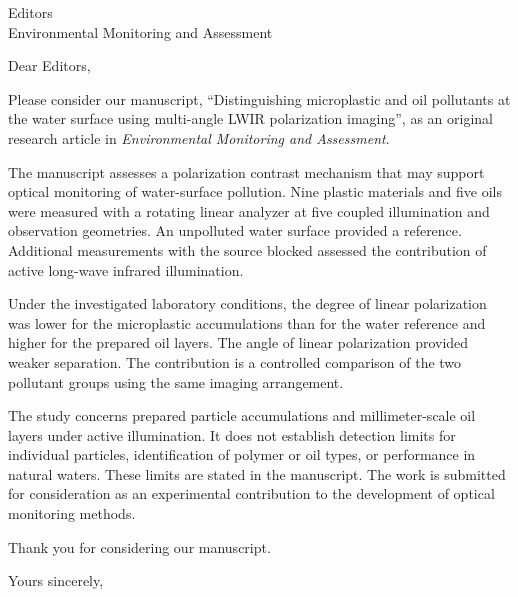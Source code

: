\documentclass[11pt,a4paper]{letter}
\date{20 October 2026}
\begin{document}
\begin{letter}{Editors\\Environmental Monitoring and Assessment}
\opening{Dear Editors,}

Please consider our manuscript, ``Distinguishing microplastic and oil pollutants at the water surface using multi-angle LWIR polarization imaging'', as an original research article in \textit{Environmental Monitoring and Assessment}.

The manuscript assesses a polarization contrast mechanism that may support optical monitoring of water-surface pollution. Nine plastic materials and five oils were measured with a rotating linear analyzer at five coupled illumination and observation geometries. An unpolluted water surface provided a reference. Additional measurements with the source blocked assessed the contribution of active long-wave infrared illumination.

Under the investigated laboratory conditions, the degree of linear polarization was lower for the microplastic accumulations than for the water reference and higher for the prepared oil layers. The angle of linear polarization provided weaker separation. The contribution is a controlled comparison of the two pollutant groups using the same imaging arrangement.

The study concerns prepared particle accumulations and millimeter-scale oil layers under active illumination. It does not establish detection limits for individual particles, identification of polymer or oil types, or performance in natural waters. These limits are stated in the manuscript. The work is submitted for consideration as an experimental contribution to the development of optical monitoring methods.

Thank you for considering our manuscript.

\closing{Yours sincerely,}
\end{letter}
\end{document}
